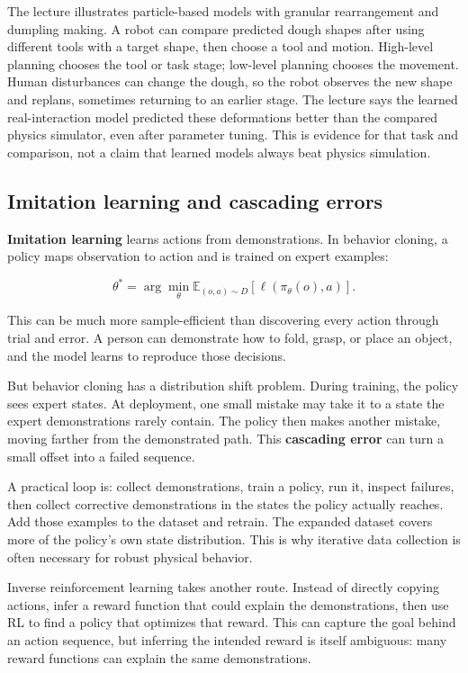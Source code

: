The lecture illustrates particle-based models with granular rearrangement and dumpling making. A robot can compare predicted dough shapes after using different tools with a target shape, then choose a tool and motion. High-level planning chooses the tool or task stage; low-level planning chooses the movement. Human disturbances can change the dough, so the robot observes the new shape and replans, sometimes returning to an earlier stage. The lecture says the learned real-interaction model predicted these deformations better than the compared physics simulator, even after parameter tuning. This is evidence for that task and comparison, not a claim that learned models always beat physics simulation.

\subsection{Imitation learning and cascading errors}\label{04-visual-computing-ii-ch034-imitation-learning-and-cascading-errors}

\textbf{Imitation learning} learns actions from demonstrations. In behavior cloning, a policy maps observation to action and is trained on expert examples:

\[
\theta^*=\arg\min_\theta\mathbb{E}_{(o,a)\sim D}\left[\ell(\pi_\theta(o),a)\right].
\]

This can be much more sample-efficient than discovering every action through trial and error. A person can demonstrate how to fold, grasp, or place an object, and the model learns to reproduce those decisions.

But behavior cloning has a distribution shift problem. During training, the policy sees expert states. At deployment, one small mistake may take it to a state the expert demonstrations rarely contain. The policy then makes another mistake, moving farther from the demonstrated path. This \textbf{cascading error} can turn a small offset into a failed sequence.

A practical loop is: collect demonstrations, train a policy, run it, inspect failures, then collect corrective demonstrations in the states the policy actually reaches. Add those examples to the dataset and retrain. The expanded dataset covers more of the policy's own state distribution. This is why iterative data collection is often necessary for robust physical behavior.

Inverse reinforcement learning takes another route. Instead of directly copying actions, infer a reward function that could explain the demonstrations, then use RL to find a policy that optimizes that reward. This can capture the goal behind an action sequence, but inferring the intended reward is itself ambiguous: many reward functions can explain the same demonstrations.

